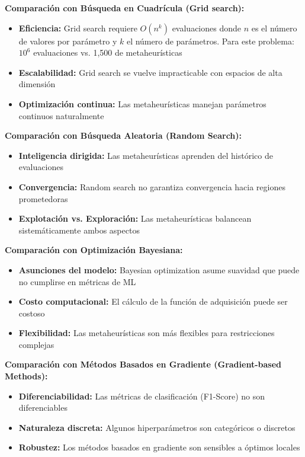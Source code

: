 \textbf{Comparación con Búsqueda en Cuadrícula (Grid search):}
\begin{itemize}
    \item \textbf{Eficiencia:} Grid search requiere $O(n^k)$ evaluaciones donde $n$ es el número de valores por parámetro y $k$ el número de parámetros. Para este problema: $10^6$ evaluaciones vs. 1,500 de metaheurísticas
    \item \textbf{Escalabilidad:} Grid search se vuelve impracticable con espacios de alta dimensión
    \item \textbf{Optimización continua:} Las metaheurísticas manejan parámetros continuos naturalmente
\end{itemize}

\textbf{Comparación con Búsqueda Aleatoria (Random Search):}
\begin{itemize}
    \item \textbf{Inteligencia dirigida:} Las metaheurísticas aprenden del histórico de evaluaciones
    \item \textbf{Convergencia:} Random search no garantiza convergencia hacia regiones prometedoras
    \item \textbf{Explotación vs. Exploración:} Las metaheurísticas balancean sistemáticamente ambos aspectos
\end{itemize}

\textbf{Comparación con Optimización Bayesiana:}
\begin{itemize}
    \item \textbf{Asunciones del modelo:} Bayesian optimization asume suavidad que puede no cumplirse en métricas de ML
    \item \textbf{Costo computacional:} El cálculo de la función de adquisición puede ser costoso
    \item \textbf{Flexibilidad:} Las metaheurísticas son más flexibles para restricciones complejas
\end{itemize}

\textbf{Comparación con Métodos Basados en Gradiente (Gradient-based Methods):}
\begin{itemize}
    \item \textbf{Diferenciabilidad:} Las métricas de clasificación (F1-Score) no son diferenciables
    \item \textbf{Naturaleza discreta:} Algunos hiperparámetros son categóricos o discretos
    \item \textbf{Robustez:} Los métodos basados en gradiente son sensibles a óptimos locales
\end{itemize}

